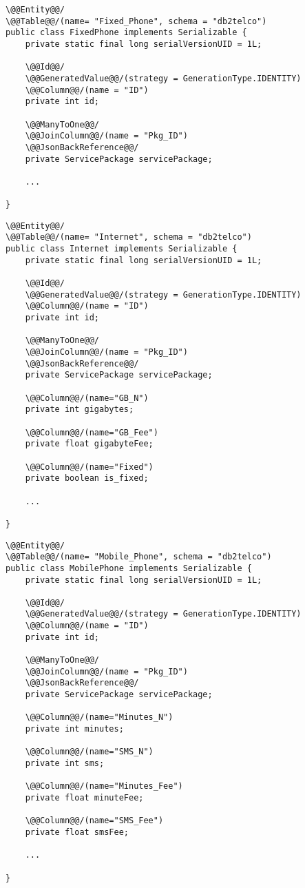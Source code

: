 \begin{lstlisting}[style = JPA]
\@@Entity@@/
\@@Table@@/(name= "Fixed_Phone", schema = "db2telco")
public class FixedPhone implements Serializable {
    private static final long serialVersionUID = 1L;

    \@@Id@@/
    \@@GeneratedValue@@/(strategy = GenerationType.IDENTITY)
    \@@Column@@/(name = "ID")
    private int id;

    \@@ManyToOne@@/
    \@@JoinColumn@@/(name = "Pkg_ID")
    \@@JsonBackReference@@/
    private ServicePackage servicePackage;

    ...

}
\end{lstlisting}

\begin{lstlisting}[style = JPA]
\@@Entity@@/
\@@Table@@/(name= "Internet", schema = "db2telco")
public class Internet implements Serializable {
    private static final long serialVersionUID = 1L;

    \@@Id@@/
    \@@GeneratedValue@@/(strategy = GenerationType.IDENTITY)
    \@@Column@@/(name = "ID")
    private int id;

    \@@ManyToOne@@/
    \@@JoinColumn@@/(name = "Pkg_ID")
    \@@JsonBackReference@@/
    private ServicePackage servicePackage;

    \@@Column@@/(name="GB_N")
    private int gigabytes;

    \@@Column@@/(name="GB_Fee")
    private float gigabyteFee;

    \@@Column@@/(name="Fixed")
    private boolean is_fixed;
    
    ...

}
\end{lstlisting}

\begin{lstlisting}[style = JPA]
\@@Entity@@/
\@@Table@@/(name= "Mobile_Phone", schema = "db2telco")
public class MobilePhone implements Serializable {
    private static final long serialVersionUID = 1L;

    \@@Id@@/
    \@@GeneratedValue@@/(strategy = GenerationType.IDENTITY)
    \@@Column@@/(name = "ID")
    private int id;

    \@@ManyToOne@@/
    \@@JoinColumn@@/(name = "Pkg_ID")
    \@@JsonBackReference@@/
    private ServicePackage servicePackage;

    \@@Column@@/(name="Minutes_N")
    private int minutes;

    \@@Column@@/(name="SMS_N")
    private int sms;

    \@@Column@@/(name="Minutes_Fee")
    private float minuteFee;

    \@@Column@@/(name="SMS_Fee")
    private float smsFee;
    
    ...

}
\end{lstlisting}

